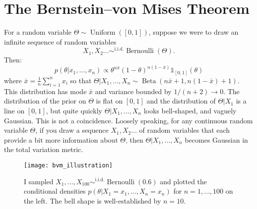 
\section{The Bernstein--von Mises Theorem}  
For a random variable $\Theta\sim\operatorname{Uniform}([0,1])$, suppose we were to draw an infinite sequence of random variables
\[
X_1, X_2 \dotsc\sim^\text{i.i.d.}\operatorname{Bernoulli}(\Theta).
\]
Then:
\[
p(\theta | x_1,\dotsc, x_n)
\propto \theta^{n\bar x} (1-\theta)^{n(1-\bar x) } \mathds{1}_{[0,1]}(\theta)
\]
where $\bar x =  \tfrac{1}{n}\sum_{i=1}^n x_i$ so that $\Theta|X_1,\dotsc,X_n \sim \operatorname{Beta}(n\bar x+1, n(1-\bar x)+1)$.  This distribution has mode $\bar x$ and variance bounded by $1/(n+2)\to 0$.  The distribution of the prior on $\Theta$ is flat on $[0,1]$ and the distribution of $\Theta|X_1$ is a line on $[0,1]$, but quite quickly $\Theta|X_1,\dotsc,X_n$ looks bell-shaped, and vaguely Gaussian.   This is not a coincidence.  Loosely speaking, for any continuous random variable $\Theta$, if you draw a sequence $X_1, X_2 \dotsc$ of random variables that each provide a bit more information about $\Theta$, then $\Theta|X_1,\dotsc,X_n$ becomes Gaussian in the total variation metric.  

\begin{figure}
\begin{minipage}[c]{.45\textwidth}
\texttt{[image: bvm\_illustration]}
\end{minipage}%
\hfill
\begin{minipage}[c]{.45\textwidth}
\caption[An Illustration of the Bernstein--von Mises Theorem]{I sampled $X_1,\dotsc,X_{100}\sim^\text{i.i.d.}\operatorname{Bernoulli}(0.6)$ and plotted the conditional densities $p(\theta|X_1=x_1,\dotsc,X_n=x_n)$ for $n=1,\dotsc, 100$ on the left.  The bell shape is well-established by $n=10$.}
\end{minipage}
\end{figure}

